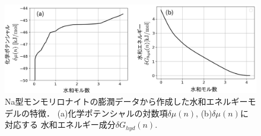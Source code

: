 \begin{figure}[h]
	\begin{center}
	\includegraphics[width=1.0\linewidth]{Figs/fig2.pdf} 
	\end{center}
	\caption{
		Na型モンモリロナイトの膨潤データから作成した水和エネルギーモデルの特徴．
		(a)化学ポテンシャルの対数項$\delta \mu(n)$, (b)$\delta \mu(n)$に対応する
		水和エネルギー成分$\delta G_{hyd}(n)$.
	} 
	\label{fig:fig2}
\end{figure}
